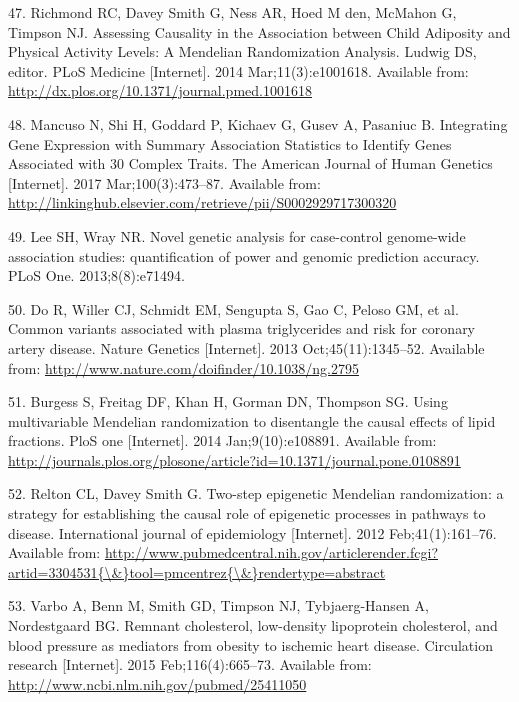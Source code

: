 \documentclass[]{article}
\begin{document}
\hypertarget{ref-Richmond2014}{}
47. Richmond RC, Davey Smith G, Ness AR, Hoed M den, McMahon G, Timpson
NJ. Assessing Causality in the Association between Child Adiposity and
Physical Activity Levels: A Mendelian Randomization Analysis. Ludwig DS,
editor. PLoS Medicine {[}Internet{]}. 2014 Mar;11(3):e1001618. Available
from: \url{http://dx.plos.org/10.1371/journal.pmed.1001618}

\hypertarget{ref-Mancuso2017}{}
48. Mancuso N, Shi H, Goddard P, Kichaev G, Gusev A, Pasaniuc B.
Integrating Gene Expression with Summary Association Statistics to
Identify Genes Associated with 30 Complex Traits. The American Journal
of Human Genetics {[}Internet{]}. 2017 Mar;100(3):473--87. Available
from:
\url{http://linkinghub.elsevier.com/retrieve/pii/S0002929717300320}

\hypertarget{ref-Lee2013c}{}
49. Lee SH, Wray NR. Novel genetic analysis for case-control genome-wide
association studies: quantification of power and genomic prediction
accuracy. PLoS One. 2013;8(8):e71494.

\hypertarget{ref-Do2013}{}
50. Do R, Willer CJ, Schmidt EM, Sengupta S, Gao C, Peloso GM, et al.
Common variants associated with plasma triglycerides and risk for
coronary artery disease. Nature Genetics {[}Internet{]}. 2013
Oct;45(11):1345--52. Available from:
\url{http://www.nature.com/doifinder/10.1038/ng.2795}

\hypertarget{ref-Burgess2014a}{}
51. Burgess S, Freitag DF, Khan H, Gorman DN, Thompson SG. Using
multivariable Mendelian randomization to disentangle the causal effects
of lipid fractions. PloS one {[}Internet{]}. 2014 Jan;9(10):e108891.
Available from:
\url{http://journals.plos.org/plosone/article?id=10.1371/journal.pone.0108891}

\hypertarget{ref-Relton2012}{}
52. Relton CL, Davey Smith G. Two-step epigenetic Mendelian
randomization: a strategy for establishing the causal role of epigenetic
processes in pathways to disease. International journal of epidemiology
{[}Internet{]}. 2012 Feb;41(1):161--76. Available from:
\href{http://www.pubmedcentral.nih.gov/articlerender.fcgi?artid=3304531\%7B/\&\%7Dtool=pmcentrez\%7B/\&\%7Drendertype=abstract}{http://www.pubmedcentral.nih.gov/articlerender.fcgi?artid=3304531\{\textbackslash{}\&\}tool=pmcentrez\{\textbackslash{}\&\}rendertype=abstract}

\hypertarget{ref-Varbo2015}{}
53. Varbo A, Benn M, Smith GD, Timpson NJ, Tybjaerg-Hansen A,
Nordestgaard BG. Remnant cholesterol, low-density lipoprotein
cholesterol, and blood pressure as mediators from obesity to ischemic
heart disease. Circulation research {[}Internet{]}. 2015
Feb;116(4):665--73. Available from:
\url{http://www.ncbi.nlm.nih.gov/pubmed/25411050}
\end{document}
